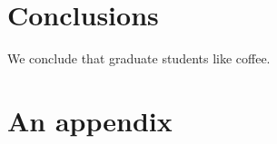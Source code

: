 \documentclass{uiucthesis2021}
\begin{document}
\chapter{Conclusions}

We conclude that graduate students like coffee.


\backmatter

\printbibliography[heading=bibintoc,title={References}]

\mainmatter  %

\appendix

\chapter{An appendix}

\lipsum[1-5]

% 
\end{document}
